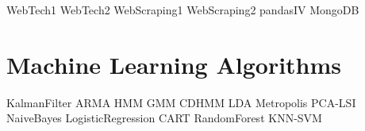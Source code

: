 \documentclass[nociteref]{SIAM-GH-book}
\begin{document}
{WebTech1}
{WebTech2}
{WebScraping1}
{WebScraping2}
{pandasIV}
{MongoDB}

\part{Machine Learning Algorithms}
{KalmanFilter}
{ARMA}
{HMM}
{GMM}
{CDHMM}
{LDA}
{Metropolis}
{PCA-LSI}
{NaiveBayes}
{LogisticRegression}
{CART}
{RandomForest}
{KNN-SVM}
\end{document}
